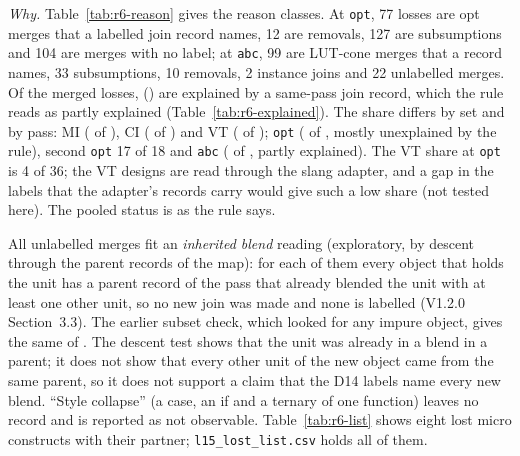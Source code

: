 \documentclass[conference]{IEEEtran}
\newcommand{\code}[1]{\texttt{#1}}
\begin{document}
\emph{Why.} Table~\ref{tab:r6-reason} gives the reason classes. At \code{opt}, 77 losses are
opt merges that a labelled join record names, 12 are removals, 127 are subsumptions and 104 are
merges with no label; at \code{abc}, 99 are LUT-cone merges that a record names, 33 subsumptions,
10 removals, 2 instance joins and 22 unlabelled merges. Of the \rsxMergedAll{} merged losses,
\rsxExplainedAll{} (\rsxExplainedShare) are explained by a same-pass join record, which the
rule reads as partly explained (Table~\ref{tab:r6-explained}). The share differs by set
and by pass: MI \rsxExplShareMI{} (\rsxExplExplainedMI{} of \rsxExplMergedMI{}), CI
\rsxExplShareCI{} (\rsxExplExplainedCI{} of \rsxExplMergedCI{}) and VT \rsxExplShareVT{}
(\rsxExplExplainedVT{} of \rsxExplMergedVT{}); \code{opt} \rsxExplShareOpt{}
(\rsxExplExplainedOpt{} of \rsxExplMergedOpt{}, mostly unexplained by the rule), second \code{opt}
17 of 18 and \code{abc} \rsxExplShareAbc{} (\rsxExplExplainedAbc{} of \rsxExplMergedAbc{}, partly
explained). The VT share at \code{opt} is 4 of 36; the VT designs are read through the slang
adapter, and a gap in the labels that the adapter's records carry would give such a low share (not
tested here). The pooled status is as the rule says.

All \rsxUnlabelledAll{} unlabelled merges fit an \emph{inherited blend} reading (exploratory, by
descent through the parent records of the map): for each of them every object that
holds the unit has a parent record of the pass that already blended the unit with at least one
other unit, so no new join was made and none is labelled (V1.2.0 Section~3.3). The earlier subset
check, which looked for any impure object, gives the same \rsxInheritedSubsetAll{} of
\rsxUnlabelledAll{}. The descent test shows that the unit was already in a blend in a parent; it does not
show that every other unit of the new object came from the same parent, so it does not support a
claim that the D14 labels name every new blend. ``Style collapse'' (a
case, an if and a ternary of one function) leaves no record and is reported as not observable.
Table~\ref{tab:r6-list} shows eight lost micro constructs with their partner;
\code{l15\_lost\_list.csv} holds all of them.
\end{document}
